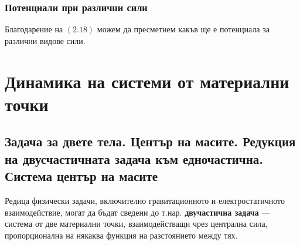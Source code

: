 \documentclass{report}
\begin{document}
\subsection{Потенциали при различни сили}
Благодарение на $(2.18)$  можем да пресметнем какъв ще е потенциала за различни видове сили.
\chapter{Динамика на системи от материални точки}
\section{Задача за двете тела. Център на масите. Редукция на двусчастичната задача към едночастична. Система център на масите}


Редица физически задачи, включително гравитационното и електростатичното взаимодействие, могат да бъдат сведени до т.нар. \textbf{двучастична задача} — система от две материални точки, взаимодействащи чрез централна сила, пропорционална на някаква функция на разстоянието между тях.
\end{document}
